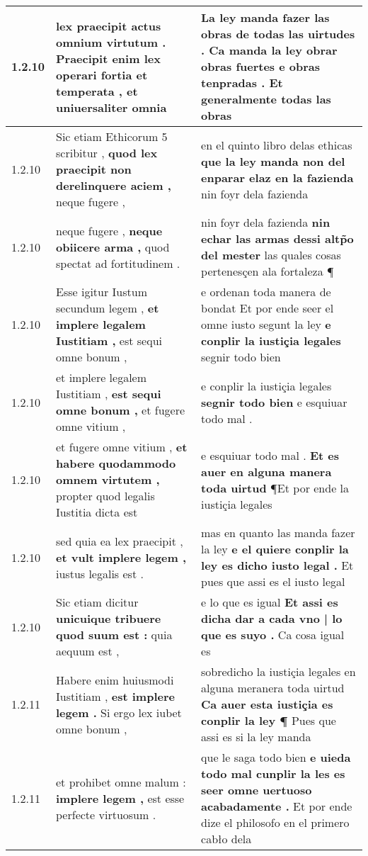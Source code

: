 \begin{tabular}{|p{1cm}|p{6.5cm}|p{6.5cm}|}
1.2.10 & lex praecipit actus omnium virtutum . \textbf{ Praecipit enim lex operari fortia et temperata , } et uniuersaliter omnia & La ley manda fazer las obras de todas las uirtudes . \textbf{ Ca manda la ley obrar obras fuertes e obras tenpradas . } Et generalmente todas las obras \\\hline
1.2.10 & Sic etiam Ethicorum 5 scribitur , \textbf{ quod lex praecipit non derelinquere aciem , } neque fugere , & en el quinto libro delas ethicas \textbf{ que la ley manda non del enparar elaz en la fazienda } nin foyr dela fazienda \\\hline
1.2.10 & neque fugere , \textbf{ neque obiicere arma , } quod spectat ad fortitudinem . & nin foyr dela fazienda \textbf{ nin echar las armas dessi altp̃o del mester } las quales cosas pertenesçen ala fortaleza ¶ \\\hline
1.2.10 & Esse igitur Iustum secundum legem , \textbf{ et implere legalem Iustitiam , } est sequi omne bonum , & e ordenan toda manera de bondat Et por ende seer el omne iusto segunt la ley \textbf{ e conplir la iustiçia legales } segnir todo bien \\\hline
1.2.10 & et implere legalem Iustitiam , \textbf{ est sequi omne bonum , } et fugere omne vitium , & e conplir la iustiçia legales \textbf{ segnir todo bien } e esquiuar todo mal . \\\hline
1.2.10 & et fugere omne vitium , \textbf{ et habere quodammodo omnem virtutem , } propter quod legalis Iustitia dicta est & e esquiuar todo mal . \textbf{ Et es auer en alguna manera toda uirtud } ¶Et por ende la iustiçia legales \\\hline
1.2.10 & sed quia ea lex praecipit , \textbf{ et vult implere legem , } iustus legalis est . & mas en quanto las manda fazer la ley \textbf{ e el quiere conplir la ley es dicho iusto legal . } Et pues que assi es el iusto legal \\\hline
1.2.10 & Sic etiam dicitur \textbf{ unicuique tribuere quod suum est : } quia aequum est , & e lo que es igual \textbf{ Et assi es dicha dar a cada vno | lo que es suyo . } Ca cosa igual es \\\hline
1.2.11 & Habere enim huiusmodi Iustitiam , \textbf{ est implere legem . } Si ergo lex iubet omne bonum , & sobredicho la iustiçia legales en alguna meranera toda uirtud \textbf{ Ca auer esta iustiçia es conplir la ley ¶ } Pues que assi es si la ley manda \\\hline
1.2.11 & et prohibet omne malum : \textbf{ implere legem , } est esse perfecte virtuosum . & que le saga todo bien \textbf{ e uieda todo mal cunplir la les es seer omne uertuoso acabadamente . } Et por ende dize el philosofo en el primero cabło dela \\\hline

\end{tabular}
